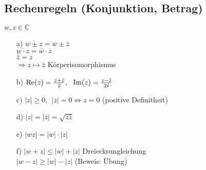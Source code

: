 \documentclass[12pt,titlepage, pdf]{article}
\newcommand{\C}{\mathds{C}}
\renewcommand{\Re}[1]{\text{Re}(#1)}
\renewcommand{\Im}[1]{\text{Im}(#1)}
\renewcommand{\i}{\textbf{\textit{i}}}
\renewcommand{\>}{\rightarrow}
\renewcommand{\*}{\cdot}
\begin{document}
	\subsection{Rechenregeln (Konjunktion, Betrag)}
	$w,z \in \C$
	\begin{itemize}
		\item[a)] $\overline{w \pm z} = \overline{w} \pm \overline{z}$\\
		$\overline{w \cdot z} = \overline{w} \cdot \overline{z}$\\
		$\bar{\bar{z}} = z$\\
		$\Rightarrow z \mapsto \bar{z}$ Körperisomorphismus
		\item[b)] $\Re{z} =  \frac{z + \bar{z}}{2},~~ \Im{z} = \frac{z - \bar{z}}{2\i}$
		\item[c)] $|z| \geq 0,~~ |z| = 0 \Leftrightarrow z = 0$ (positive Definitheit)
		\item[d)] $|z| = |\bar{z}| = \sqrt{z\bar{z}}$
		\item[e)] $|wz| = |w| \cdot |z|$
		\item[f)] $|w+z| \leq |w| + |z|$ Dreiecksungleichung \\
		$|w-z| \geq |w| - |z|$ (Beweis: Übung)
	\end{itemize}
\end{document}
